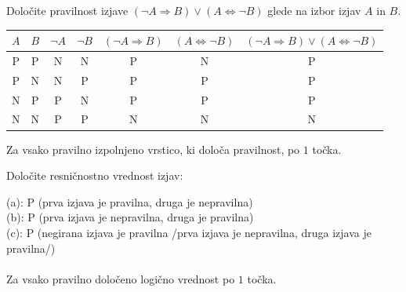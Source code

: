 \documentclass[addpoints]{exam}
\begin{document}
\begin{questions}

    
    \question[4]
    Določite pravilnost izjave $(\lnot A\Rightarrow  B)\lor (A\Leftrightarrow \lnot B)$ glede na izbor izjav $A$ in $B$.

    \begin{solution}[8cm]
        \begin{table}[H]
            \begin{tabular}{ccccccc}
             $A$ & $B$ & $\lnot A$ & $\lnot B$ & $(\lnot A\Rightarrow B)$ & $(A\Leftrightarrow \lnot B)$ & $(\lnot A\Rightarrow B)\lor(A\Leftrightarrow \lnot B)$\\ \hline
             P & P & N & N & P & N & P \\ 
             P & N & N & P & P & P & P \\
             N & P & P & N & P & P & P \\
             N & N & P & P & N & N & N
            \end{tabular}
        \end{table}
        Za vsako pravilno izpolnjeno vrstico, ki določa pravilnost, po $1$ točka.

    \end{solution}




    \question[3]
    Določite resničnostno vrednost izjav:

    \begin{solution}
        (a): P (prva izjava je pravilna, druga je nepravilna) \\
        (b): P (prva izjava je nepravilna, druga je pravilna) \\
        (c): P (negirana izjava je pravilna /prva izjava je nepravilna, druga izjava je pravilna/) \\ \\
        Za vsako pravilno določeno logično vrednost po $1$ točka.
    \end{solution}




\end{questions}
\end{document}
